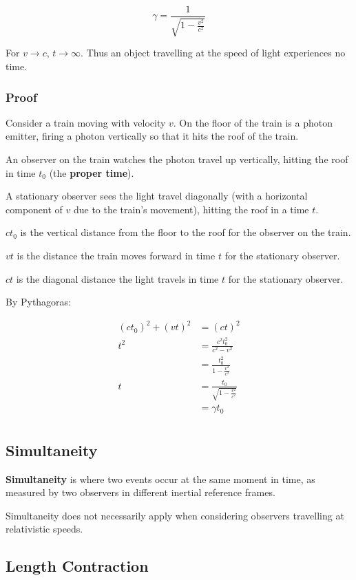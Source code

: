 \documentclass[a4paper,11pt]{report}
\begin{document}
$$
\gamma = \frac{1}{\sqrt{1 - \frac{v^2}{c^2}}}
$$

For $v \to c$, $t \to \infty$. Thus an object travelling at the speed of light
experiences no time.

\subsubsection{Proof}

Consider a train moving with velocity $v$. On the floor of the train is a
photon emitter, firing a photon vertically so that it hits the roof of the
train.

An observer on the train watches the photon travel up vertically, hitting the
roof in time $t_0$ (the \textbf{proper time}).

A stationary observer sees the light travel diagonally (with a horizontal
component of $v$ due to the train's movement), hitting the roof in a time $t$.

$ct_0$ is the vertical distance from the floor to the roof for the observer on
the train.

$vt$ is the distance the train moves forward in time $t$ for the stationary
observer.

$ct$ is the diagonal distance the light travels in time $t$ for the stationary
observer.

By Pythagoras:

$$
\begin{aligned}
(ct_0)^2 + (vt)^2 & = (ct)^2 \\
t^2 & = \frac{c^2t_0^2}{c^2 - v^2} \\
& = \frac{t_0^2}{1 - \frac{v^2}{c^2}} \\
t & = \frac{t_0}{\sqrt{1 - \frac{v^2}{c^2}}} \\
& = \gamma t_0 \\
\end{aligned}
$$

\subsection{Simultaneity}

\textbf{Simultaneity} is where two events occur at the same moment in time, as
measured by two observers in different inertial reference frames.

Simultaneity does not necessarily apply when considering observers travelling
at relativistic speeds.

\subsection{Length Contraction}
\end{document}
